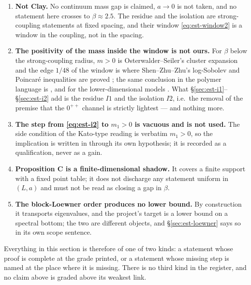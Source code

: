 \begin{enumerate}[label=(\roman*),leftmargin=2.2em]
\item \textbf{Not Clay.} No continuum mass gap is claimed, $a\to0$ is not taken, and no statement
      here crosses to $\beta\approx2.5$. The residue and the isolation are strong-coupling
      statements at fixed spacing, and their window \eqref{eq:est-window2} is a window in the
      coupling, not in the spacing.
\item \textbf{The positivity of the mass inside the window is not ours.} For $\beta$ below the
      strong-coupling radius, $m>0$ is Osterwalder--Seiler's cluster expansion \cite{osterwalder-seiler}
      and the edge $1/48$ of the window is where Shen--Zhu--Zhu's log-Sobolev and Poincar\'e
      inequalities are proved \cite{szz}; the same conclusion in
      the polymer language is \cite{seiler,bgdf}, and for the lower-dimensional models
      \cite{gjs,fo}. What \S\ref{sec:est-i1}--\S\ref{sec:est-i2}
      add is the residue $I1$ and the isolation $I2$, i.e.\ the removal of the premise that the
      $0^{++}$ channel is strictly lightest --- and nothing more.
\item \textbf{The step from \eqref{eq:est-i2} to $m_1>0$ is vacuous and is not used.} The side
      condition of the Kato-type reading is verbatim $m_1>0$, so the implication is written in
      through its own hypothesis; it is recorded as a qualification, never as a gain.
\item \textbf{Proposition C is a finite-dimensional shadow.} It covers a finite support with a fixed
      point table; it does not discharge any statement uniform in $(L,a)$ and must not be read as
      closing a gap in $\beta$. 
\item \textbf{The block-Loewner order produces no lower bound.} By construction it transports
      eigenvalues, and the project's target is a lower bound on a spectral bottom; the two are
      different objects, and \S\ref{sec:est-loewner} says so in its own scope sentence.
\end{enumerate}

\noindent Everything in this section is therefore of one of two kinds: a statement whose proof is
complete at the grade printed, or a statement whose missing step is named at the place where it is
missing. There is no third kind in the register, and no claim above is graded above its weakest link.

\endgroup
